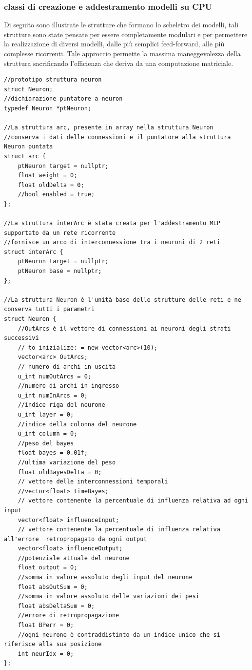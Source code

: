 \documentclass[10pt,a4paper]{article}
\begin{document}
\subsubsection{classi di creazione e addestramento modelli su CPU}
Di seguito sono illustrate le strutture che formano lo scheletro dei modelli, tali strutture sono state pensate per essere completamente modulari e per permettere la realizzazione di diversi modelli, dalle più semplici feed-forward, alle più complesse ricorrenti. Tale approccio permette la massima maneggevolezza della struttura sacrificando l'efficienza che deriva da una computazione matriciale.
\begin{lstlisting}[style=mycuda, caption=struct strutturali del modello, captionpos=b]
//prototipo struttura neuron
struct Neuron; 
//dichiarazione puntatore a neuron
typedef Neuron *ptNeuron;

//La struttura arc, presente in array nella struttura Neuron
//conserva i dati delle connessioni e il puntatore alla struttura Neuron puntata 
struct arc {
	ptNeuron target = nullptr;
	float weight = 0;
	float oldDelta = 0;
	//bool enabled = true;
};

//La struttura interArc è stata creata per l'addestramento MLP supportato da un rete ricorrente
//fornisce un arco di interconnessione tra i neuroni di 2 reti
struct interArc {
	ptNeuron target = nullptr;
	ptNeuron base = nullptr;
};

//La struttura Neuron è l'unità base delle strutture delle reti e ne conserva tutti i parametri
struct Neuron {
	//OutArcs è il vettore di connessioni ai neuroni degli strati successivi 
	// to inizialize: = new vector<arc>(10);
	vector<arc> OutArcs; 
	// numero di archi in uscita
	u_int numOutArcs = 0; 
	//numero di archi in ingresso
	u_int numInArcs = 0; 
	//indice riga del neurone	
	u_int layer = 0; 
	//indice della colonna del neurone
	u_int column = 0; 
	//peso del bayes
	float bayes = 0.01f; 
	//ultima variazione del peso
	float oldBayesDelta = 0; 
	// vettore delle interconnessioni temporali
	//vector<float> timeBayes; 
	// vettore contenente la percentuale di influenza relativa ad ogni input
	vector<float> influenceInput; 
	// vettore contenente la percentuale di influenza relativa all'errore  retropropagato da ogni output
	vector<float> influenceOutput; 
	//potenziale attuale del neurone
	float output = 0; 
	//somma in valore assoluto degli input del neurone
	float absOutSum = 0; 
	//somma in valore assoluto delle variazioni dei pesi
	float absDeltaSum = 0; 
	//errore di retropropagazione
	float BPerr = 0; 
	//ogni neurone è contraddistinto da un indice unico che si riferisce alla sua posizione
	int neurIdx = 0; 
};


\end{lstlisting}
\end{document}
